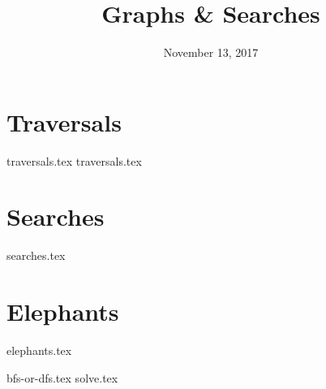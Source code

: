 \documentclass[11pt]{exam}
\title{Graphs \& Searches}
\date{November 13, 2017}
\begin{document}
\maketitle

\section{Traversals}
\begin{questions}
{traversals.tex}
{traversals.tex}
\end{questions}

\clearpage

\section{Searches}
\begin{questions}
{searches.tex}
\end{questions}

\section{Elephants}
{elephants.tex}
\begin{questions}
{bfs-or-dfs.tex}
{solve.tex}
\end{questions}
\end{document}
